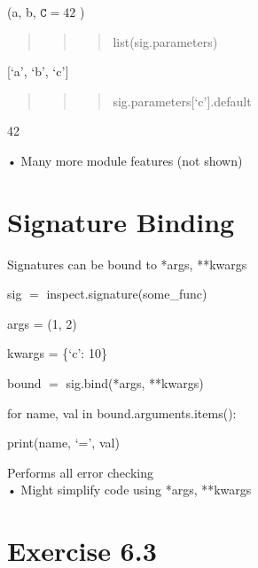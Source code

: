 \documentclass[
  letterpaper,
  DIV=11,
  numbers=noendperiod]{scrreprt}
\begin{document}
(a, b, \(\mathtt { C } = 4 2\) )

\begin{quote}
\begin{quote}
\begin{quote}
list(sig.parameters)
\end{quote}
\end{quote}
\end{quote}

{[}`a', `b', `c'{]}

\begin{quote}
\begin{quote}
\begin{quote}
sig.parameters{[}`c'{]}.default
\end{quote}
\end{quote}
\end{quote}

42

\begin{quote}
\begin{quote}
\begin{quote}
\end{quote}
\end{quote}
\end{quote}

• Many more module features (not shown)


\chapter{Signature Binding}\label{signature-binding}

Signatures can be bound to *args, **kwargs

sig \(=\) inspect.signature(some\_func)

args = (1, 2)

kwargs = \{`c': 10\}

bound \(=\) sig.bind(*args, **kwargs)

for name, val in bound.arguments.items():

print(name, `=', val)

Performs all error checking\\
• Might simplify code using *args, **kwargs


\chapter{Exercise 6.3}\label{exercise-6.3}
\end{document}
